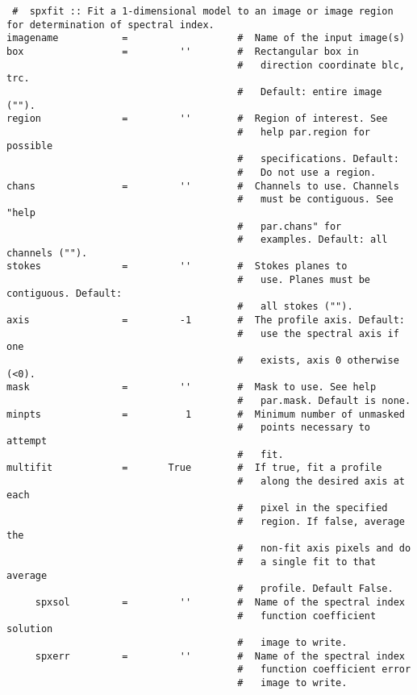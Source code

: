 \small
\begin{verbatim}
 #  spxfit :: Fit a 1-dimensional model to an image or image region
for determination of spectral index.
imagename           =                   #  Name of the input image(s)
box                 =         ''        #  Rectangular box in
                                        #   direction coordinate blc, trc.
                                        #   Default: entire image ("").
region              =         ''        #  Region of interest. See
                                        #   help par.region for possible
                                        #   specifications. Default:
                                        #   Do not use a region.
chans               =         ''        #  Channels to use. Channels
                                        #   must be contiguous. See "help
                                        #   par.chans" for
                                        #   examples. Default: all channels ("").
stokes              =         ''        #  Stokes planes to
                                        #   use. Planes must be contiguous. Default:
                                        #   all stokes ("").
axis                =         -1        #  The profile axis. Default:
                                        #   use the spectral axis if one
                                        #   exists, axis 0 otherwise (<0).
mask                =         ''        #  Mask to use. See help
                                        #   par.mask. Default is none.
minpts              =          1        #  Minimum number of unmasked
                                        #   points necessary to attempt
                                        #   fit.
multifit            =       True        #  If true, fit a profile
                                        #   along the desired axis at each
                                        #   pixel in the specified
                                        #   region. If false, average the
                                        #   non-fit axis pixels and do
                                        #   a single fit to that average
                                        #   profile. Default False.
     spxsol         =         ''        #  Name of the spectral index
                                        #   function coefficient solution
                                        #   image to write.
     spxerr         =         ''        #  Name of the spectral index
                                        #   function coefficient error
                                        #   image to write.

\end{verbatim}
